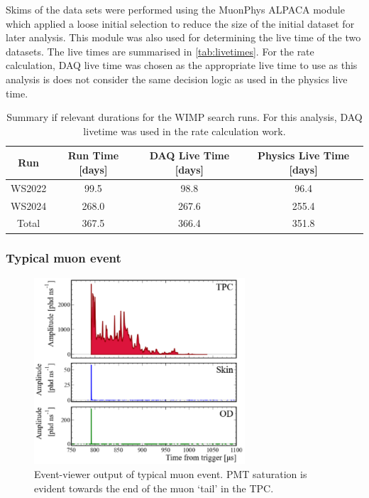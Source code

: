 Skims of the data sets were performed using the {\selectfont MuonPhys} ALPACA module which applied a loose initial selection to reduce the size of the initial dataset for later analysis. This module was also used for determining the live time of the two datasets. The live times are summarised in \autoref{tab:livetimes}. For the rate calculation, DAQ live time was chosen as the appropriate live time to use as this analysis is does not consider the same decision logic as used in the physics live time.

\begin{table}[htbp]
    \centering
    \caption{Summary if relevant durations for the WIMP search runs. For this analysis, DAQ livetime was used in the rate calculation work.}
    \begin{tabular}{|c|c|c|c|}
        \hline
        \textbf{Run} & \textbf{Run Time [days]} & \textbf{DAQ Live Time [days]} & \textbf{Physics Live Time [days]} \\
        \hline
        WS2022 & 99.5 & 98.8 & 96.4 \\
        WS2024 & 268.0 & 267.6 & 255.4 \\
        Total & 367.5 & 366.4 & 351.8 \\
        \hline
    \end{tabular}
    \label{tab:livetimes}
\end{table}

\subsubsection{Typical muon event}
\begin{figure}[htbp]
    \centering \includegraphics[width=0.7\textwidth]{figures/Muons/LZap_waveform.pdf}
    \caption{Event-viewer output of typical muon event. PMT saturation is evident towards the end of the muon ‘tail’ in the TPC.}
    \label{fig:Muons/eventViewer}
\end{figure}

